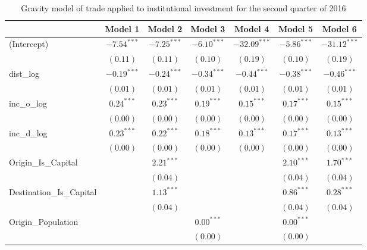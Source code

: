 \begin{table}
	\begin{center}
		\small
		\caption[Gravity Model of Trade for Q2 2016]{Gravity model of trade applied to institutional investment for the second quarter of 2016}
		\begin{tabular}{l c c c c c c }
			\hline
			& Model 1 & Model 2 & Model 3 & Model 4 & Model 5 & Model 6 \\
			\hline
			(Intercept)                  & $-7.54^{***}$ & $-7.25^{***}$ & $-6.10^{***}$ & $-32.09^{***}$ & $-5.86^{***}$ & $-31.12^{***}$ \\
			& $(0.11)$      & $(0.11)$      & $(0.10)$      & $(0.19)$       & $(0.10)$      & $(0.19)$       \\
			dist\_log                    & $-0.19^{***}$ & $-0.24^{***}$ & $-0.34^{***}$ & $-0.44^{***}$  & $-0.38^{***}$ & $-0.46^{***}$  \\
			& $(0.01)$      & $(0.01)$      & $(0.01)$      & $(0.01)$       & $(0.01)$      & $(0.01)$       \\
			inc\_o\_log                  & $0.24^{***}$  & $0.23^{***}$  & $0.19^{***}$  & $0.15^{***}$   & $0.17^{***}$  & $0.15^{***}$   \\
			& $(0.00)$      & $(0.00)$      & $(0.00)$      & $(0.00)$       & $(0.00)$      & $(0.00)$       \\
			inc\_d\_log                  & $0.23^{***}$  & $0.22^{***}$  & $0.18^{***}$  & $0.13^{***}$   & $0.17^{***}$  & $0.13^{***}$   \\
			& $(0.00)$      & $(0.00)$      & $(0.00)$      & $(0.00)$       & $(0.00)$      & $(0.00)$       \\
			Origin\_Is\_Capital          &               & $2.21^{***}$  &               &                & $2.10^{***}$  & $1.70^{***}$   \\
			&               & $(0.04)$      &               &                & $(0.04)$      & $(0.04)$       \\
			Destination\_Is\_Capital     &               & $1.13^{***}$  &               &                & $0.86^{***}$  & $0.28^{***}$   \\
			&               & $(0.04)$      &               &                & $(0.04)$      & $(0.04)$       \\
			Origin\_Population           &               &               & $0.00^{***}$  &                & $0.00^{***}$  &                \\
			&               &               & $(0.00)$      &                & $(0.00)$      &                \\

\end{tabular}
\end{center}
\end{table}
